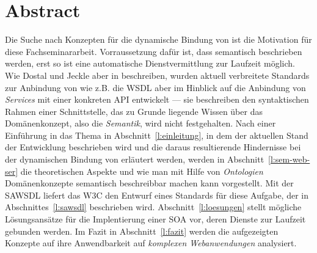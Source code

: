 \section*{Abstract}

Die Suche nach Konzepten für die dynamische Bindung von \ws ist die Motivation für diese Fachseminararbeit. Vorraussetzung dafür ist, dass \ws semantisch beschrieben werden, erst so ist eine automatische Dienstvermittlung zur Laufzeit möglich. Wie Dostal und Jeckle aber in \cite[S.55]{xmlspek1} beschreiben, wurden aktuell verbreitete Standards zur Anbindung von \ws wie z.B. die \acs{WSDL} aber im Hinblick auf die Anbindung von \emph{Services} mit einer konkreten \acs{API} entwickelt --- sie beschreiben den syntaktischen Rahmen einer Schnittstelle, das zu Grunde liegende Wissen über das Domänenkonzept, also die \emph{Semantik}, wird nicht festgehalten. Nach einer Einführung in das Thema in Abschnitt~\ref{l:einleitung}, in dem der aktuellen Stand der Entwicklung beschrieben wird und die daraus resultierende Hindernisse bei der dynamischen Bindung von \ws erläutert werden, werden in Abschnitt~\ref{l:sem-web-ser} die theoretischen Aspekte und wie man mit Hilfe von \emph{Ontologien} Domänenkonzepte semantisch beschreibbar machen kann vorgestellt. Mit der \acs{SAWSDL} liefert das \acs{W3C} den Entwurf eines Standards für diese Aufgabe, der in Abschnittes~\ref{l:sawsdl} beschrieben wird. Abschnitt~\ref{l:loesungen} stellt mögliche Lösungsansätze für die Implentierung einer \acs{SOA} vor, deren Dienste zur Laufzeit gebunden werden. Im Fazit in Abschnitt~\ref{l:fazit} werden die aufgezeigten Konzepte auf ihre Anwendbarkeit auf \emph{komplexen Webanwendungen} analysiert.